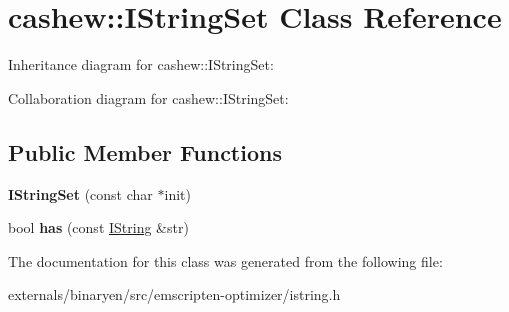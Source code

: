 \hypertarget{classcashew_1_1_i_string_set}{}\section{cashew\+:\+:I\+String\+Set Class Reference}
\label{classcashew_1_1_i_string_set}


Inheritance diagram for cashew\+:\+:I\+String\+Set\+:


Collaboration diagram for cashew\+:\+:I\+String\+Set\+:
\subsection*{Public Member Functions}
\begin{DoxyCompactItemize}
\item 
\mbox{\label{classcashew_1_1_i_string_set_a93b62baa3df9f80022d3b14716fc5318}} 
{\bfseries I\+String\+Set} (const char $\ast$init)
\item 
\mbox{\label{classcashew_1_1_i_string_set_abbae01b58109e818e5b6755ea3dc01a5}} 
bool {\bfseries has} (const \mbox{\hyperlink{structcashew_1_1_i_string}{I\+String}} \&str)
\end{DoxyCompactItemize}


The documentation for this class was generated from the following file\+:\begin{DoxyCompactItemize}
\item 
externals/binaryen/src/emscripten-\/optimizer/istring.\+h\end{DoxyCompactItemize}
